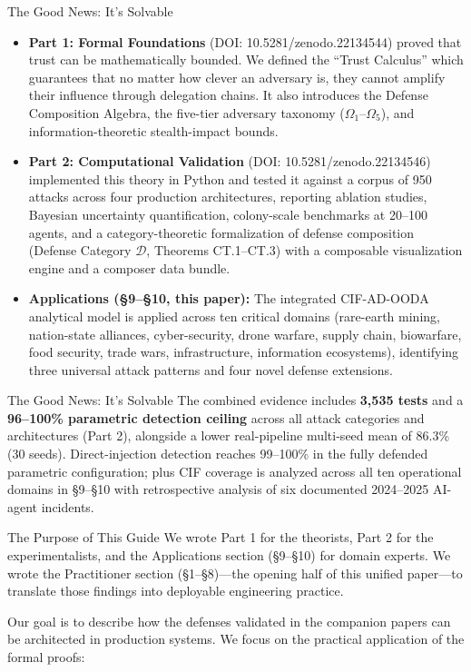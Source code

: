 \documentclass[
  ignorenonframetext,
]{beamer}
\providecommand{\tightlist}{%
  \setlength{\itemsep}{0pt}\setlength{\parskip}{0pt}}
\providecommand{\calD}{\mathcal{D}}
\begin{document}
\begin{frame}[allowframebreaks]{The Good News: It's Solvable}
\begin{itemize}
\tightlist
\item
  \textbf{Part 1: Formal Foundations} (DOI: 10.5281/zenodo.22134544)
  proved that trust can be mathematically bounded. We defined the
  ``Trust Calculus'' which guarantees that no matter how clever an
  adversary is, they cannot amplify their influence through delegation
  chains. It also introduces the Defense Composition Algebra, the
  five-tier adversary taxonomy (\(\Omega_1\)--\(\Omega_5\)), and
  information-theoretic stealth-impact bounds.
\item
  \textbf{Part 2: Computational Validation} (DOI:
  10.5281/zenodo.22134546) implemented this theory in Python and tested
  it against a corpus of 950 attacks across four production
  architectures, reporting ablation studies, Bayesian uncertainty
  quantification, colony-scale benchmarks at 20--100 agents, and a
  category-theoretic formalization of defense composition (Defense
  Category \(\calD\), Theorems CT.1--CT.3) with a composable
  visualization engine and a composer data bundle.
\item
  \textbf{Applications (§9--§10, this paper):} The integrated
  CIF-AD-OODA analytical model is applied across ten critical domains
  (rare-earth mining, nation-state alliances, cyber-security, drone
  warfare, supply chain, biowarfare, food security, trade wars,
  infrastructure, information ecosystems), identifying three universal
  attack patterns and four novel defense extensions.
\end{itemize}

\end{frame}

\begin{frame}[allowframebreaks]{The Good News: It's Solvable}
The combined evidence includes \textbf{3,535 tests} and a
\textbf{96--100\% parametric detection ceiling} across all attack
categories and architectures (Part 2), alongside a lower real-pipeline
multi-seed mean of 86.3\% (30 seeds). Direct-injection detection reaches
99--100\% in the fully defended parametric configuration; plus CIF
coverage is analyzed across all ten operational domains in §9--§10 with
retrospective analysis of six documented 2024--2025 AI-agent incidents.
\end{frame}

\begin{frame}[allowframebreaks]{The Purpose of This Guide}
\protect{}\label{the-purpose-of-this-guide}
We wrote Part 1 for the theorists, Part 2 for the experimentalists, and
the Applications section (§9--§10) for domain experts. We wrote the
Practitioner section (§1--§8)---the opening half of this unified
paper---to translate those findings into deployable engineering
practice.

Our goal is to describe how the defenses validated in the companion
papers can be architected in production systems. We focus on the
practical application of the formal proofs:

\end{frame}
\end{document}
